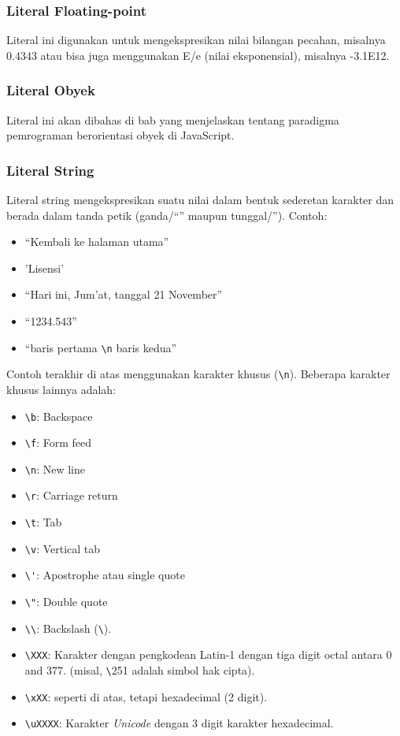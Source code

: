 \subsubsection{Literal Floating-point}

Literal ini digunakan untuk mengekspresikan nilai bilangan pecahan, misalnya 0.4343 atau bisa juga menggunakan E/e (nilai eksponensial), misalnya 
-3.1E12.

\subsubsection{Literal Obyek}

Literal ini akan dibahas di bab yang menjelaskan tentang paradigma pemrograman berorientasi obyek di JavaScript.

\subsubsection{Literal String}

Literal string mengekspresikan suatu nilai dalam bentuk sederetan karakter dan berada dalam tanda petik (ganda/``'' maupun tunggal/''). Contoh:
\begin{itemize}
   \item ``Kembali ke halaman utama''
   \item 'Lisensi'
   \item ``Hari ini, Jum'at, tanggal 21 November''
   \item ``1234.543''
   \item ``baris pertama \verb+\n+ baris kedua''
 \end{itemize}

Contoh terakhir di atas menggunakan karakter khusus (\verb+\n+). Beberapa karakter khusus lainnya adalah:

\begin{itemize}
  \item \verb+\b+: Backspace
  \item \verb+\f+: Form feed
  \item \verb+\n+: New line
  \item \verb+\r+: Carriage return
  \item \verb+\t+: Tab
  \item \verb+\v+: Vertical tab
  \item \verb+\'+: Apostrophe atau single quote
  \item \verb+\"+: Double quote
  \item \verb+\\+:	Backslash (\verb+\+).
  \item \verb+\XXX+: Karakter dengan pengkodean Latin-1 dengan tiga digit octal antara 0 and 377. (misal, \verb+\+251 adalah simbol hak cipta).
  \item \verb+\xXX+: seperti di atas, tetapi hexadecimal (2 digit).
  \item \verb+\uXXXX+: Karakter \textit{Unicode} dengan 3 digit karakter hexadecimal.
\end{itemize}

